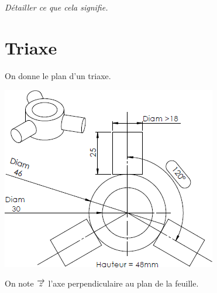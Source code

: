 \documentclass[10pt,fleqn]{article} %
\begin{document}
\begin{multicols}{2}
%
%
%
%
%
%
%
%
%
%	
\subparagraph{}
\textit{Détailler ce que cela signifie.}
\ifprof
\begin{corrige}
\end{corrige}
\else

\section*{Triaxe}
\setcounter{exo}{0}
On donne le plan d'un triaxe. 

\begin{center}
\includegraphics[width=.9\linewidth]{images/triaxe.png}
\end{center}
On note $\overrightarrow{z}$ l'axe perpendiculaire au plan de la feuille.



\end{multicols}
\end{document}
